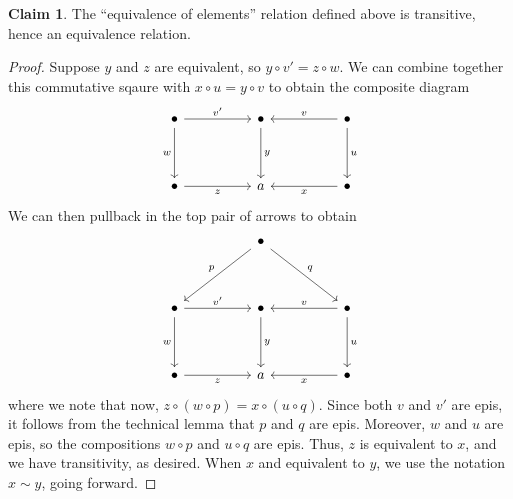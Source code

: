 \documentclass[aps,pra,showpacs,notitlepage,onecolumn,superscriptaddress,nofootinbib]{revtex4-1}
\theoremstyle{definition}
\newtheorem{claim}{Claim}[section]
\begin{document}
\begin{claim}
  The ``equivalence of elements'' relation defined above is transitive, hence an equivalence relation.
  \end{claim}
\begin{proof}
  Suppose $y$ and $z$ are equivalent, so $y \circ v' = z \circ w$. We can combine together this commutative sqaure with $x \circ u = y \circ v$ to obtain the composite diagram
  \[\begin{tikzcd}
	\bullet && \bullet && \bullet \\
	\\
	\bullet && a && \bullet
	\arrow["{v'}", from=1-1, to=1-3]
	\arrow["w"', from=1-1, to=3-1]
	\arrow["y", from=1-3, to=3-3]
	\arrow["v"', from=1-5, to=1-3]
	\arrow["u", from=1-5, to=3-5]
	\arrow["z"', from=3-1, to=3-3]
	\arrow["x", from=3-5, to=3-3]
  \end{tikzcd}\]
  We can then pullback in the top pair of arrows to obtain
  \[\begin{tikzcd}
	&& \bullet \\
	\\
	\bullet && \bullet && \bullet \\
	\\
	\bullet && a && \bullet
	\arrow["p"', from=1-3, to=3-1]
	\arrow["q", from=1-3, to=3-5]
	\arrow["{v'}", from=3-1, to=3-3]
	\arrow["w"', from=3-1, to=5-1]
	\arrow["y", from=3-3, to=5-3]
	\arrow["v"', from=3-5, to=3-3]
	\arrow["u", from=3-5, to=5-5]
	\arrow["z"', from=5-1, to=5-3]
	\arrow["x", from=5-5, to=5-3]
  \end{tikzcd}\]
  where we note that now, $z \circ (w \circ p) = x \circ (u \circ q)$. Since both $v$ and $v'$ are epis, it follows from the technical lemma that $p$ and $q$ are epis. Moreover, $w$ and $u$ are epis, so the
  compositions $w \circ p$ and $u \circ q$ are epis. Thus, $z$ is equivalent to $x$, and we have transitivity, as desired. When $x$ and equivalent to $y$, we use the notation $x \sim y$, going forward.
  \end{proof}
\end{document}
